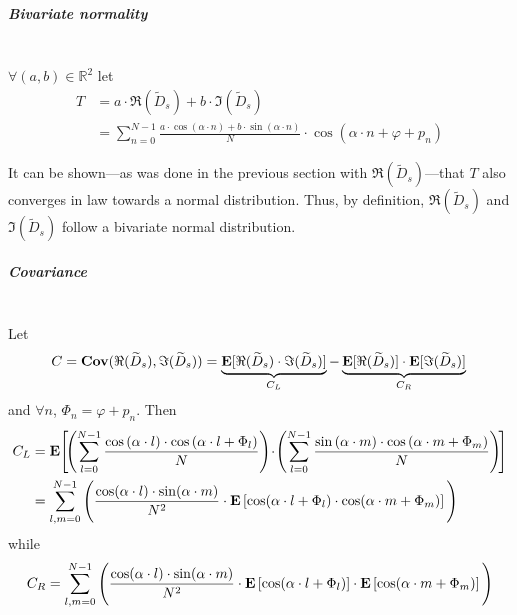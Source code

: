 \subparagraph{Bivariate normality}\mbox{}\\

$\forall (a,b) \in \mathbb{R}^2$ let
\begin{equation}
	\begin{aligned}
		T &= a\cdot \Re(\widetilde{D}_s) + b \cdot \Im(\widetilde{D}_s)\\
		&= \sum_{n=0}^{N-1} \frac{a \cdot \cos \left(\alpha \cdot n\right) + b \cdot \sin \left(\alpha \cdot n\right)}{N} \cdot \cos \left(\alpha \cdot n + \varphi + p_n \right)
	\end{aligned}
\end{equation}

It can be shown---as was done in the previous section with $\Re(\widetilde{D}_s)$---that $T$ also converges in law towards a normal distribution. Thus, by definition, $\Re(\widetilde{D}_s)$ and $\Im(\widetilde{D}_s)$ follow a bivariate normal distribution.

\subparagraph{Covariance}\mbox{}\\
Let
\begin{equation}
	C = \mathbf{Cov} (\Re(\widetilde{D}_s), \Im(\widetilde{D}_s)) = \underbrace{\mathbf{E} [\Re(\widetilde{D}_s)\cdot \Im(\widetilde{D}_s)]}_{C_L} - \underbrace{\mathbf{E} [\Re(\widetilde{D}_s)] \cdot \mathbf{E} [\Im(\widetilde{D}_s)]}_{C_R}\\
\end{equation}
and $\forall n$, $\Phi_n = \varphi + p_n$. Then
\begin{equation}
	\begin{aligned}
		C_L &= \mathbf{E} \Bigg[\!\! \left(\sum_{l=0}^{N-1} \frac{\cos \left(\alpha \cdot l\right) \cdot \cos \left(\alpha \cdot l + \Phi_l \right)}{N} \right)\! \cdot\! \left(\sum_{l=0}^{N-1} \frac{\sin \left(\alpha\cdot m\right) \cdot \cos \left(\alpha \cdot m + \Phi_m \right)}{N} \right)\!\! \Bigg] \\
		&= \sum_{l,m=0}^{N-1} \Bigg( \frac{\cos (\alpha \cdot l) \cdot \sin (\alpha \cdot m)}{N^2} \cdot \mathbf{E} \left[\cos(\alpha \cdot l + \Phi_l) \cdot \cos(\alpha \cdot m + \Phi_m) \right] \Bigg)
	\end{aligned}
\end{equation}
while
\begin{equation}
	C_R = \sum_{l,m=0}^{N-1} \Bigg( \frac{\cos (\alpha \cdot l) \cdot \sin (\alpha \cdot m)}{N^2} \cdot \mathbf{E} \left[\cos(\alpha \cdot l + \Phi_l)\right] \cdot \mathbf{E} \left[ \cos(\alpha \cdot m + \Phi_m) \right] \Bigg)
\end{equation}

